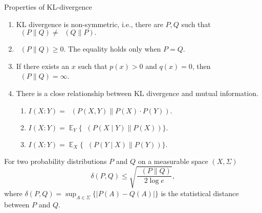 \documentclass[
aspectratio=169]{beamer}
\DeclareMathOperator*{\E}{\mathbb{E}}
\DeclareMathOperator{\KL}{D_{KL}}
\newcommand{\midd}{\parallel}
\begin{document}
\begin{frame}{Properties of KL-divergence}
    \begin{enumerate}
        \item KL divergence is non-symmetric, i.e., there are $P,Q$ such that
        $\KL(P\midd Q) \neq \KL(Q\midd P).$

        \item
        $\KL(P\midd Q) \geq 0.$
        The equality holds only when $P=Q$.

        \item If there exists an $x$ such that $p(x)>0$ and $q(x)=0$, then $\KL(P\midd Q) = \infty$.

        \item There is a close relationship between KL divergence and mutual information.
        \begin{enumerate}
            \item $I(X:Y) = \KL(P(X, Y)\midd P(X)\cdot P(Y)).$\label{lst:KL-prop:3-1}
            \item $I(X:Y) = \E_Y \{ \KL(P(X \mid Y) \midd P(X)) \}.$\label{lst:KL-prop:3-2}
            \item $I(X:Y) = \E_X \{ \KL(P(Y \mid X) \midd P(Y)) \}.$\label{lst:KL-prop:3-3}
        \end{enumerate}
    \end{enumerate}
    \begin{theorem}
        For two probability distributions $P$ and $Q$ on a measurable space $(X,\Sigma)$
        \[
        \delta (P,Q)\leq \sqrt{\frac{\KL(P\midd Q)}{2\log e}},
        \]
        where $\delta (P,Q)=\sup_{A\in \Sigma} \bigl \{ |P(A)-Q(A)|\bigr \}$ is the statistical distance between $P$ and $Q$.
    \end{theorem}
\end{frame}
\end{document}
